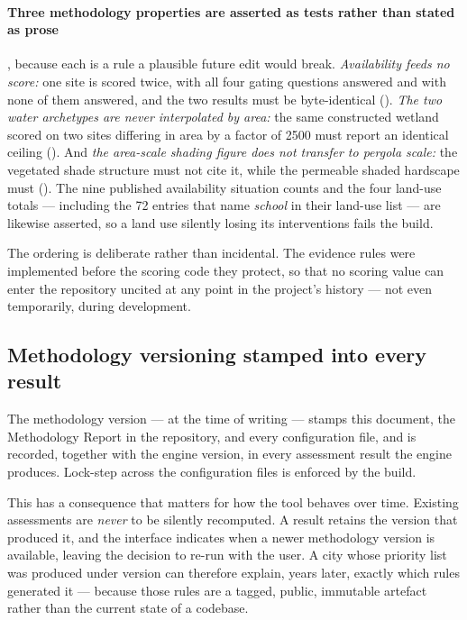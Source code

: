 \paragraph{Three methodology properties are asserted as tests rather than
stated as prose}, because each is a rule a plausible future edit would break.
\emph{Availability feeds no score:} one site is scored twice, with all four
gating questions answered and with none of them answered, and the two results
must be byte-identical (). \emph{The two water
archetypes are never interpolated by area:} the same constructed wetland scored
on two sites differing in area by a factor of \num{2500} must report an
identical ceiling (). And \emph{the area-scale shading
figure does not transfer to pergola scale:} the vegetated shade structure must
not cite it, while the permeable shaded hardscape must
(). The nine published availability situation counts and the four
land-use totals --- including the \num{72} entries that name \emph{school} in
their land-use list --- are likewise asserted, so a land use silently losing
its interventions fails the build.

The ordering is deliberate rather than incidental. The evidence rules were
implemented before the scoring code they protect, so that no scoring value can
enter the repository uncited at any point in the project's history --- not even
temporarily, during development.

\subsection{Methodology versioning stamped into every result}

The methodology version --- \methver{} at the time of writing --- stamps this
document, the Methodology Report in the repository, and every configuration
file, and is recorded, together with the engine version, in every assessment
result the engine produces. Lock-step across the configuration files is
enforced by the build.

This has a consequence that matters for how the tool behaves over time.
Existing assessments are \emph{never} to be silently recomputed. A result
retains the version that produced it, and the interface indicates when a newer
methodology version is available, leaving the decision to re-run with the user.
A city
whose priority list was produced under version \methver{} can therefore explain,
years later, exactly which rules generated it --- because those rules are a
tagged, public, immutable artefact rather than the current state of a codebase.

